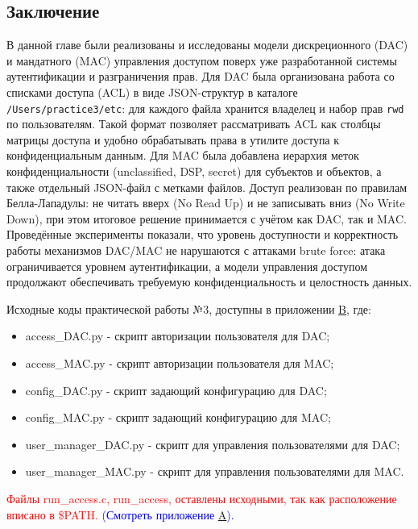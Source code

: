\documentclass[areasetadvanced]{scrartcl}
\begin{document}
\subsection*{Заключение}

В данной главе были реализованы и исследованы модели дискреционного (DAC) и мандатного (MAC) управления доступом поверх уже разработанной системы аутентификации и разграничения прав. Для DAC была организована работа со списками доступа (ACL) в виде JSON-структур в каталоге \texttt{/Users/practice3/etc}: для каждого файла хранится владелец и набор прав \texttt{rwd} по пользователям. Такой формат позволяет рассматривать ACL как столбцы матрицы доступа и удобно обрабатывать права в утилите доступа к конфиденциальным данным.
Для MAC была добавлена иерархия меток конфиденциальности (unclassified, DSP, secret) для субъектов и объектов, а также отдельный JSON-файл с метками файлов. Доступ реализован по правилам Белла-Лападулы: \guillemetleft не читать вверх \guillemetright (No Read Up) и \guillemetleft не записывать вниз \guillemetright (No Write Down), при этом итоговое решение принимается с учётом как DAC, так и MAC. Проведённые эксперименты показали, что уровень доступности и корректность работы механизмов DAC/MAC не нарушаются с аттаками brute force: атака ограничивается уровнем аутентификации, а модели управления доступом продолжают обеспечивать требуемую конфиденциальность и целостность данных.

Исходные коды практической работы №3, доступны в приложении \hyperref[sec:pril3]{B}, где:
\begin{itemize}
    \item access\_DAC.py - скрипт авторизации пользователя для DAC;
    \item access\_MAC.py - скрипт авторизации пользователя для MAC;
    \item config\_DAC.py - скрипт задающий конфигурацию для DAC;
    \item config\_MAC.py - скрипт задающий конфигурацию для MAC;
    \item user\_manager\_DAC.py - скрипт для управления пользователями для DAC;
    \item user\_manager\_MAC.py - скрипт для управления пользователями для MAC.
\end{itemize}

\textcolor{red}{Файлы run\_access.c, run\_access, оставлены исходными, так как расположение вписано в \$PATH.} \textcolor{blue}{(Смотреть приложение \hyperref[sec:pril2]{A}).}
\end{document}
